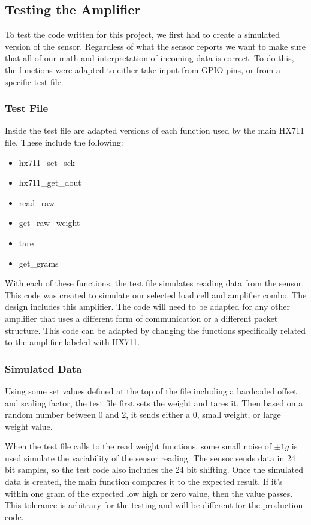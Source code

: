 \subsection{Testing the Amplifier}

To test the code written for this project, we first had to create a simulated version of the sensor. Regardless of what the sensor reports we want to make sure that all of our math and interpretation of incoming data is correct. To do this, the functions were adapted to either take input from GPIO pins, or from a specific test file. 

\subsubsection{Test File}

Inside the test file are adapted versions of each function used by the main HX711 file. These include the following:

\begin{itemize}
\item hx711\_set\_sck
\item hx711\_get\_dout
\item read\_raw
\item get\_raw\_weight
\item tare
\item get\_grams
\end{itemize}

With each of these functions, the test file simulates reading data from the sensor. This code was created to simulate our selected load cell and amplifier combo. The design includes this amplifier. The code will need to be adapted for any other amplifier that uses a different form of communication or a different packet structure. This code can be adapted by changing the functions specifically related to the amplifier labeled with HX711. 

\subsubsection{Simulated Data}

Using some set values defined at the top of the file including a hardcoded offset and scaling factor, the test file first sets the weight and tares it. Then based on a random number between 0 and 2, it sends either a 0, small weight, or large weight value. 

When the test file calls to the read weight functions, some small noise of $\pm1g$ is used simulate the variability of the sensor reading. The sensor sends data in 24 bit samples, so the test code also includes the 24 bit shifting. Once the simulated data is created, the main function compares it to the expected result. If it's within one gram of the expected low high or zero value, then the value passes. This tolerance is arbitrary for the testing and will be different for the production code. 
